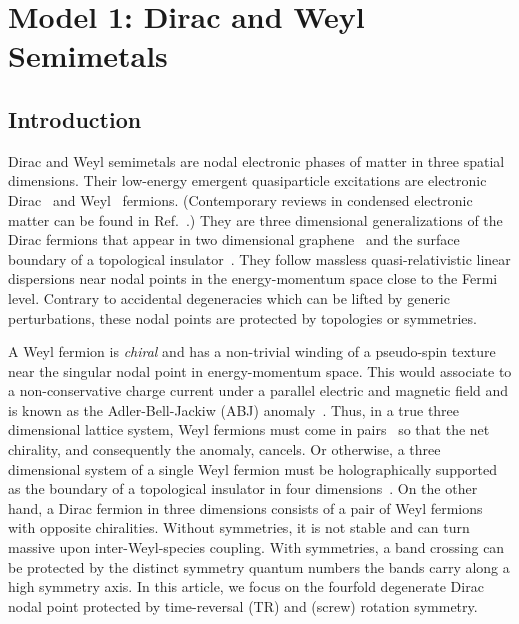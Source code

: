 \chapter{Model 1: Dirac and Weyl Semimetals}\label{chap:Model1}

\section{Introduction}\label{sec:introduction}
Dirac and Weyl semimetals are nodal electronic phases of matter in three spatial dimensions. Their low-energy emergent quasiparticle excitations are electronic Dirac~\cite{Dirac28} and Weyl~\cite{Weyl29} fermions. (Contemporary reviews in condensed electronic matter can be found in Ref.~\cite{Ashvin_Weyl_review,TurnerVishwanath13,HasanXuBian15,RMP,Burkov16,JiaXuHasan16,ArmitageMeleVishwanath16,YanFelser17}.) They are three dimensional generalizations of the Dirac fermions that appear in two dimensional graphene~\cite{NetoGuineaPeresNovoselovGeim09} and the surface boundary of a topological insulator~\cite{HasanKane10,QiZhangreview11,HasanMoore11,RMP}. They follow massless quasi-relativistic linear dispersions near nodal points in the energy-momentum space close to the Fermi level. Contrary to accidental degeneracies which can be lifted by generic perturbations, these nodal points are protected by topologies or symmetries. 

A Weyl fermion is {\em chiral} and has a non-trivial winding of a pseudo-spin texture near the singular nodal point in energy-momentum space. This would associate to a non-conservative charge current under a parallel electric and magnetic field and is known as the Adler-Bell-Jackiw (\hypertarget{ABJ}{ABJ}) anomaly~\cite{Adler69,BellJackiw69}. Thus, in a true three dimensional lattice system, Weyl fermions must come in pairs~\cite{Nielsen_Ninomiya_1981,NielsenNinomiyaPLB1981,NielsenNinomiya83} so that the net chirality, and consequently the anomaly, cancels. Or otherwise, a three dimensional system of a single Weyl fermion must be holographically supported as the boundary of a topological insulator in four dimensions~\cite{ZhangHu01,BernevigChernHuToumbasZhang02,QiHughesZhang08}. On the other hand, a Dirac fermion in three dimensions consists of a pair of Weyl fermions with opposite chiralities. Without symmetries, it is not stable and can turn massive upon inter-Weyl-species coupling. With symmetries, a band crossing can be protected by the distinct symmetry quantum numbers the bands carry along a high symmetry axis. In this article, we focus on the fourfold degenerate Dirac nodal point protected by time-reversal (\hypertarget{TR}{TR}) and (screw) rotation symmetry.

